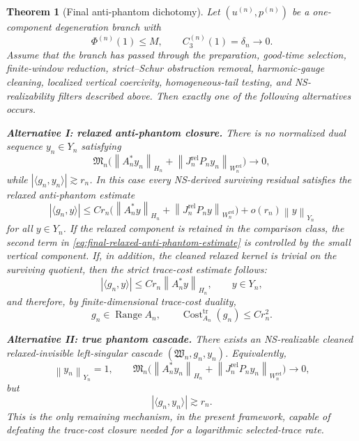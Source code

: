 \documentclass[11pt]{article}
\numberwithin{equation}{section}
\newtheorem{theorem}{Theorem}[section]
\DeclareMathOperator{\Range}{Range}
\DeclareMathOperator{\Cost}{Cost}
\newcommand{\norm}[2]{\left\|#1\right\|_{#2}}
\begin{document}
\begin{theorem}[Final anti-phantom dichotomy]\label{thm:final-anti-phantom-dichotomy}
Let \((u^{(n)},p^{(n)})\) be a one-component degeneration branch with
\[
        \Phi^{(n)}(1)\le M,
        \qquad
        C_3^{(n)}(1)=\delta_n\to0.
\]
Assume that the branch has passed through the preparation, good-time selection, finite-window
reduction, strict--Schur obstruction removal, harmonic-gauge cleaning, localized vertical coercivity,
homogeneous-tail testing, and NS-realizability filters described above.  Then exactly one of the
following alternatives occurs.

\medskip
\noindent\textbf{Alternative I: relaxed anti-phantom closure.}
There is no normalized dual sequence \(y_n\in Y_n\) satisfying
\[
        \mathfrak M_n\Big(
        \norm{A_n^*y_n}{H_n}
        +
        \norm{J_n^{\mathrm{rel}}P_ny_n}{W_n^{\mathrm{rel}}}
        \Big)\to0,
\]
while \(|\langle g_n,y_n\rangle|\gtrsim r_n\).  In this case every NS-derived surviving residual
satisfies the relaxed anti-phantom estimate
\begin{equation}\label{eq:final-relaxed-anti-phantom-estimate}
        |\langle g_n,y\rangle|
        \le
        C r_n\Big(
        \norm{A_n^*y}{H_n}
        +
        \norm{J_n^{\mathrm{rel}}P_ny}{W_n^{\mathrm{rel}}}
        \Big)
        +o(r_n)\norm{y}{Y_n}
\end{equation}
for all \(y\in Y_n\).  If the relaxed component is retained in the comparison class, the second term
in \eqref{eq:final-relaxed-anti-phantom-estimate} is controlled by the small vertical component.
If, in addition, the cleaned relaxed kernel is trivial on the surviving quotient, then the strict
trace-cost estimate follows:
\begin{equation}\label{eq:final-strict-trace-cost-estimate}
        |\langle g_n,y\rangle|
        \le
        C r_n\norm{A_n^*y}{H_n},
        \qquad y\in Y_n,
\end{equation}
and therefore, by finite-dimensional trace-cost duality,
\[
        g_n\in \Range A_n,
        \qquad
        \Cost^{\mathrm{tr}}_{A_n}(g_n)\le C r_n^2.
\]

\medskip
\noindent\textbf{Alternative II: true phantom cascade.}
There exists an NS-realizable cleaned relaxed-invisible left-singular cascade
\((\mathfrak W_n,g_n,y_n)\).  Equivalently,
\[
        \norm{y_n}{Y_n}=1,
        \qquad
        \mathfrak M_n\Big(
        \norm{A_n^*y_n}{H_n}
        +
        \norm{J_n^{\mathrm{rel}}P_ny_n}{W_n^{\mathrm{rel}}}
        \Big)\to0,
\]
but
\[
        |\langle g_n,y_n\rangle|\gtrsim r_n.
\]
This is the only remaining mechanism, in the present framework, capable of defeating the
trace-cost closure needed for a logarithmic selected-trace rate.
\end{theorem}
\end{document}
